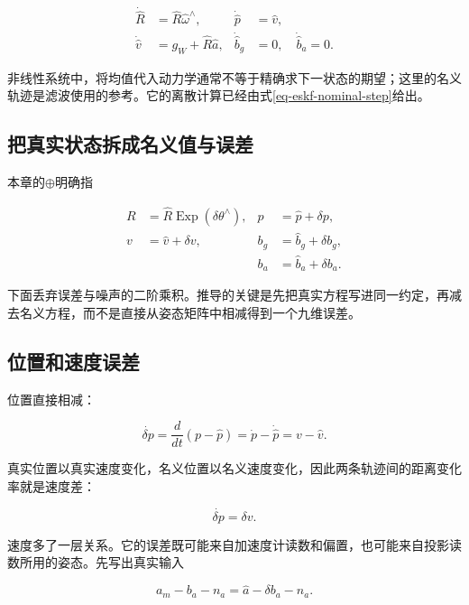 \begin{equation*}
\begin{aligned}
 \dot{\hat R}&=\hat R\hat\omega^\wedge,&\dot{\hat p}&=\hat v,\\
 \dot{\hat v}&=g_W+\hat R\hat a,&
 \dot{\hat b}_g&=0,\quad\dot{\hat b}_a=0.
\end{aligned}
\end{equation*}

非线性系统中，将均值代入动力学通常不等于精确求下一状态的期望；这里的名义轨迹是滤波使用的参考。它的离散计算已经由式\eqref{eq-eskf-nominal-step}给出。

\subsection{把真实状态拆成名义值与误差}

本章的$\oplus$明确指

\begin{equation*}
\begin{aligned}
 R&=\hat R\mathop{\mathrm{Exp}}(\delta\theta^\wedge),& p&=\hat p+\delta p,\\
 v&=\hat v+\delta v,& b_g&=\hat b_g+\delta b_g,\\
 && b_a&=\hat b_a+\delta b_a.
\end{aligned}
\end{equation*}

下面丢弃误差与噪声的二阶乘积。推导的关键是先把真实方程写进同一约定，再减去名义方程，而不是直接从姿态矩阵中相减得到一个九维误差。

\subsection{位置和速度误差}

位置直接相减：

\begin{equation*}
\dot{\delta p}=\frac{d}{dt}(p-\hat p)
               =\dot p-\dot{\hat p}=v-\hat v.
\end{equation*}

真实位置以真实速度变化，名义位置以名义速度变化，因此两条轨迹间的距离变化率就是速度差：

\begin{equation*}
\boxed{\dot{\delta p}=\delta v.}
\end{equation*}

速度多了一层关系。它的误差既可能来自加速度计读数和偏置，也可能来自投影读数所用的姿态。先写出真实输入

\begin{equation*}
a_m-b_a-n_a=\hat a-\delta b_a-n_a.
\end{equation*}

